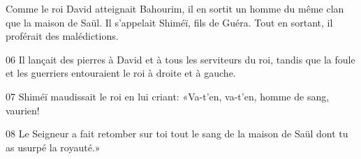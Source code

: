 Comme le roi David atteignait Bahourim, il en sortit un homme du même clan que la maison de Saül. Il s’appelait Shiméï, fils de Guéra. Tout en sortant, il proférait des malédictions.

06 Il lançait des pierres à David et à tous les serviteurs du roi, tandis que la foule et les guerriers entouraient le roi à droite et à gauche.

07 Shiméï maudissait le roi en lui criant: «Va-t’en, va-t’en, homme de sang, vaurien!

08 Le Seigneur a fait retomber sur toi tout le sang de la maison de Saül dont tu as usurpé la royauté.»

